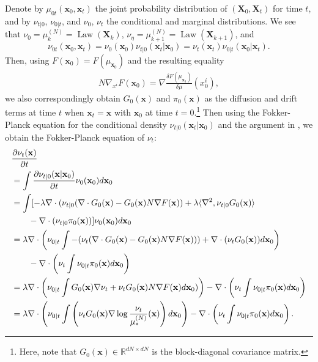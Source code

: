 \documentclass{article}
\begin{document}
Denote by $\mu_{0t}(\mathbf{x}_0,\mathbf{x}_t)$ the joint probability distribution of $(\mathbf{X}_0,\mathbf{X}_t)$ for time $t$, and by $\nu_{t|0}$, $\nu_{0|t}$, and $\nu_0$, $\nu_t$ the conditional and marginal distributions. We see that $\nu_0 = \mu_k^{(N)} = \operatorname{Law}(\mathbf{X}_k)$, $\nu_\eta = \mu_{k+1}^{(N)}=\operatorname{Law}(\mathbf{X}_{k+1})$, and \[
\nu_{0t}(\mathbf{x}_0,\mathbf{x}_t) = \nu_0(\mathbf{x}_0)\nu_{t|0}(\mathbf{x}_t|\mathbf{x}_0) = \nu_t(\mathbf{x}_t)\nu_{0|t}(\mathbf{x}_0|\mathbf{x}_t).
\]
Then, using $F(\mathbf{x}_0) = F(\mu_{\mathbf{x}_0})$ and the resulting equality
\begin{align*}
N\nabla_{x^i}F(\mathbf{x}_0) = \nabla \frac{\delta F(\mu_{\mathbf{x}_0})}{\delta\mu}(x_0^i),
\end{align*}
we also correspondingly obtain $G_0(\mathbf{x})$ and $\pi_0(\mathbf{x})$ as the diffusion and drift terms at time $t$ when $\mathbf{x}_t = \mathbf{x}$ with $\mathbf{x}_0$ at time $t = 0$.\footnote{Here, note that $G_0(\mathbf{x})\in\mathbb{R}^{dN\times dN}$ is the block-diagonal covariance matrix.} Then using the Fokker-Planck equation for the conditional density $\nu_{t|0}(\mathbf{x}_t|\mathbf{x}_0)$ \citep[Lemma 3]{wibisono2019proximal} and the argument in \citet{jiang2021mirror}, we obtain the Fokker-Planck equation of $\nu_t$: \begin{align}
    &\frac{\partial \nu_t(\mathbf{x})}{\partial t}\notag\\
    &= \int \frac{\partial\nu_{t|0}(\mathbf{x}|\mathbf{x}_0)}{\partial t}\nu_0(\mathbf{x}_0)d\mathbf{x}_0\notag \\
    &= \int[-\lambda\nabla \cdot (\nu_{t|0}(\nabla \cdot G_0(\mathbf{x}) - G_0(\mathbf{x})N\nabla F(\mathbf{x})) + \lambda\langle \nabla^2, \nu_{t|0}G_0(\mathbf{x})\rangle\notag \\
    &\qquad - \nabla\cdot (\nu_{t|0}\pi_0(\mathbf{x}))]\nu_0(\mathbf{x}_0)d\mathbf{x}_0\notag\\
    &= \lambda \nabla \cdot \left(\nu_{0|t}\int-(\nu_t(\nabla\cdot G_0(\mathbf{x})-G_0(\mathbf{x})N\nabla F(\mathbf{x}))) + \nabla \cdot(\nu_tG_0(\mathbf{x}))d\mathbf{x}_0\right)\notag\\
    &\qquad - \nabla \cdot \left(\nu_t\int \nu_{0|t}\pi_0(\mathbf{x})d\mathbf{x}_0\right)\notag\\
    &= \lambda \nabla \cdot \left(\nu_{0|t}\int G_0(\mathbf{x})\nabla \nu_t+ \nu_tG_0(\mathbf{x})N\nabla F(\mathbf{x})d\mathbf{x}_0)\right) - \nabla \cdot \left(\nu_t \int \nu_{0|t}\pi_0(\mathbf{x})d\mathbf{x}_0\right)\notag\\
    &= \lambda\nabla \cdot \left(\nu_{0|t}\int\left(\nu_t G_0(\mathbf{x})\nabla \log\frac{\nu_t}{\mu_*^{(N)}}(\mathbf{x})\right)d\mathbf{x}_0\right)- \nabla \cdot 
    \left(\nu_t\int\nu_{0|t}\pi_0(\mathbf{x})d\mathbf{x}_0\right).\label{eq:condition_pde}
\end{align}
\end{document}
